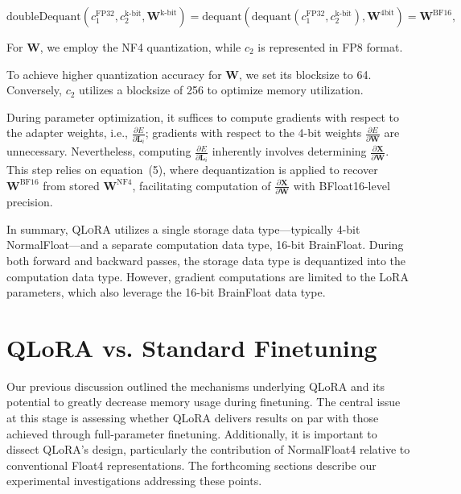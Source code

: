 \begin{equation}
    \text{doubleDequant}(c_1^{\text{FP32}}, c_2^{\text{k-bit}}, \mathbf{W}^{\text{k-bit}}) = \text{dequant}(\text{dequant}(c_1^{\text{FP32}}, c_2^{\text{k-bit}}), \mathbf{W}^{\text{4bit}}) = \mathbf{W}^{\text{BF16}},
\end{equation}

For $\mathbf{W}$, we employ the NF4 quantization, while $c_2$ is represented in FP8 format.

To achieve higher quantization accuracy for $\mathbf{W}$, we set its blocksize to 64. Conversely, $c_2$ utilizes a blocksize of 256 to optimize memory utilization.

During parameter optimization, it suffices to compute gradients with respect to the adapter weights, i.e., $\frac{\partial E}{\partial \mathbf{L}_i}$; gradients with respect to the 4-bit weights $\frac{\partial E}{\partial \mathbf{W}}$ are unnecessary. Nevertheless, computing $\frac{\partial E}{\partial \mathbf{L}_i}$ inherently involves determining $\frac{\partial \mathbf{X}}{\partial \mathbf{W}}$. This step relies on equation~(5), where dequantization is applied to recover $\mathbf{W}^{\text{BF16}}$ from stored $\mathbf{W}^{\text{NF4}}$, facilitating computation of $\frac{\partial \mathbf{X}}{\partial \mathbf{W}}$ with BFloat16-level precision.

In summary, \textsc{QLoRA} utilizes a single storage data type—typically 4-bit NormalFloat—and a separate computation data type, 16-bit BrainFloat. During both forward and backward passes, the storage data type is dequantized into the computation data type. However, gradient computations are limited to the LoRA parameters, which also leverage the 16-bit BrainFloat data type.

\section{QLoRA vs. Standard Finetuning}
\label{sec:comp_to_std}

Our previous discussion outlined the mechanisms underlying QLoRA and its potential to greatly decrease memory usage during finetuning. The central issue at this stage is assessing whether QLoRA delivers results on par with those achieved through full-parameter finetuning. Additionally, it is important to dissect QLoRA’s design, particularly the contribution of NormalFloat4 relative to conventional Float4 representations. The forthcoming sections describe our experimental investigations addressing these points.

